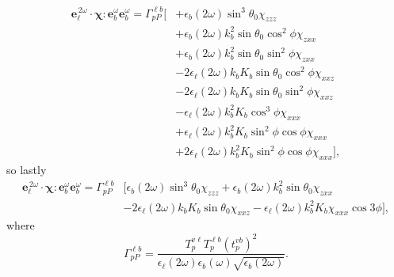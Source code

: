 \begin{equation*}
\begin{split}
\mathbf{e}^{\,2\omega}_{\ell}\cdot
\boldsymbol{\chi}:\mathbf{e}^{\omega}_{b}\mathbf{e}^{\omega}_{b} = 
\Gamma^{\ell b}_{pP}
\bigg[
&+ \epsilon_{b}(2\omega)\sin^{3}\theta_{0}\chi_{zzz}\\
&+ \epsilon_{b}(2\omega)k^{2}_{b}\sin\theta_{0}\cos^{2}\phi\chi_{zxx}\\
&+ \epsilon_{b}(2\omega)k^{2}_{b}\sin\theta_{0}\sin^{2}\phi\chi_{zxx}\\
&- 2\epsilon_{\ell}(2\omega)k_{b}K_{b}\sin\theta_{0}\cos^{2}\phi\chi_{xxz}\\
&- 2\epsilon_{\ell}(2\omega)k_{b}K_{b}\sin\theta_{0}\sin^{2}\phi\chi_{xxz}\\
&- \epsilon_{\ell}(2\omega)k^{2}_{b}K_{b}\cos^{3}\phi\chi_{xxx}\\
&+ \epsilon_{\ell}(2\omega)k^{2}_{b}K_{b}\sin^{2}\phi\cos\phi\chi_{xxx}\\
&+ 2\epsilon_{\ell}(2\omega)k^{2}_{b}K_{b}\sin^{2}\phi\cos\phi\chi_{xxx}
\bigg],
\end{split}
\end{equation*}
so lastly
\begin{equation*}
\begin{split}
\mathbf{e}^{\,2\omega}_{\ell}\cdot
\boldsymbol{\chi}:\mathbf{e}^{\omega}_{b}\mathbf{e}^{\omega}_{b} = 
\Gamma^{\ell b}_{pP}&
\bigg[
  \epsilon_{b}(2\omega)\sin^{3}\theta_{0}\chi_{zzz}
+ \epsilon_{b}(2\omega)k^{2}_{b}\sin\theta_{0}\chi_{zxx}\\
&- 2\epsilon_{\ell}(2\omega)k_{b}K_{b}\sin\theta_{0}\chi_{xxz}
- \epsilon_{\ell}(2\omega)k^{2}_{b}K_{b}\chi_{xxx}\cos3\phi
\bigg],
\end{split}
\end{equation*}
where
\begin{equation*}
\Gamma^{\ell b}_{pP}=
\frac{T^{v\ell}_{p}T^{\ell b}_{p}\left(t^{vb}_{p}\right)^{2}}
  {\epsilon_{\ell}({2\omega})\epsilon_{b}(\omega)\sqrt{\epsilon_{b}(2\omega)}}.
\end{equation*}


\stopcontents[chapters]
